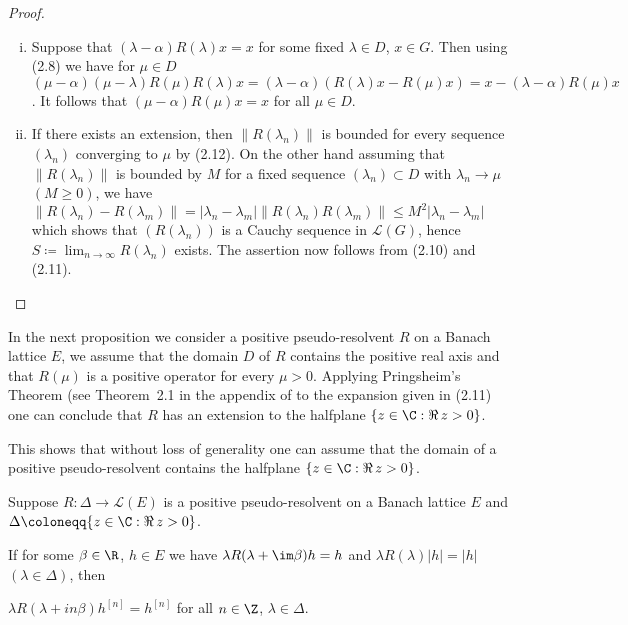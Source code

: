 \begin{proof}
	\begin{enumerate}[(i), wide]
		\item Suppose that $(\lambda-\alpha)R(\lambda)x = x$ for some fixed $\lambda \in D$, $x \in G$.
		Then using (2.8) we have for $\mu \in D$ $(\mu-\alpha)(\mu-\lambda)R(\mu)R(\lambda)x = (\lambda-\alpha)(R(\lambda)x - R(\mu)x) = x - (\lambda-\alpha)R(\mu)x$.
		It follows that $(\mu-\alpha)R(\mu)x = x$ for all $\mu \in D$.
		
		\item If there exists an extension, then $\|R(\lambda_{n})\|$ is bounded for every sequence $(\lambda_{n})$ converging to $\mu$ by (2.12).
		On the other hand assuming that $\|R(\lambda_{n})\|$ is bounded by $M$ for a fixed sequence $(\lambda_{n}) \subset D$ with $\lambda_{n} \to \mu$ $(M \geq 0)$, we have
		\newline
		 $\|R(\lambda_{n}) - R(\lambda_{m})\| = |\lambda_{n}-\lambda_{m}| \|R(\lambda_{n})R(\lambda_{m})\| \leq M^2|\lambda_{n}-\lambda_{m}|$ which shows that $(R(\lambda_{n}))$ is a Cauchy sequence in $\mathcal{L}(G)$, hence $S \coloneq \lim_{n\to\infty}R(\lambda_{n})$ exists.
		The assertion now follows from (2.10) and (2.11).
	\end{enumerate}
\end{proof}

In the next proposition we consider a positive pseudo-resolvent $R$ on a Banach lattice $E$, \ie  we assume that the domain $D$ of $R$ contains the positive real axis and that $R(\mu)$ is a positive operator for every $\mu > 0$.
Applying Pringsheim's Theorem (see Theorem~2.1 in the appendix
%
%
of \citet{schaefer:1966} to the expansion given in (2.11) one can conclude that $R$ has an extension to the halfplane $\{z \in \C  : \Re\, z > 0\}$.

This shows that without loss of generality one can assume that the domain of a positive pseudo-resolvent contains the halfplane $\{z \in \C  : \Re\, z > 0\}$.
\begin{proposition}\label{prop:c3-2.7}
	Suppose $R : \Delta \to \mathcal{L}(E)$ is a positive pseudo-resolvent on a Banach lattice $E$ and $\Delta \coloneqq \{z \in \C  : \Re\, z > 0\}$.
	
	If for some $\beta \in \R $, $h \in E$ we have
	$\lambda R(\lambda+\im\beta)h = h$ and $\lambda R(\lambda)|h| = |h|$ $(\lambda \in \Delta)$, then
	
	$\lambda R(\lambda+in\beta)h^{[n]} = h^{[n]}$ for all $n \in \Z$, $\lambda \in \Delta$.
\end{proposition}

